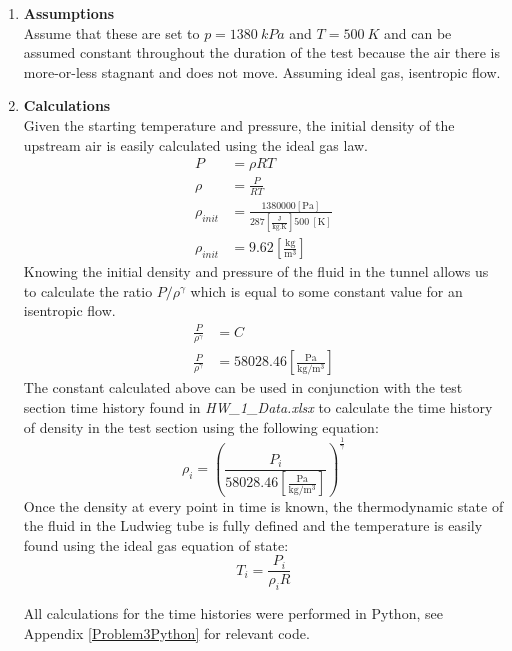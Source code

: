 \documentclass[12pt,letterpaper]{article}
\begin{document}
\begin{enumerate}[label=(\alph*)]
\begin{enumerate}[label=\arabic*.]
			\item{\textbf{Assumptions}}\\
			Assume that these are set to $p = 1380 \ \unit{kPa}$ and $T = 500 \ \unit{K}$ and can be assumed constant throughout the duration of the test because the air there is more-or-less stagnant and does not move. 
			Assuming ideal gas, isentropic flow. 
			\item{\textbf{Calculations}}\\
			Given the starting temperature and pressure, the initial density of the upstream air is easily calculated using the ideal gas law.
			\begin{align*}
				P &= \rho R T\\
				\rho &= \frac{P}{RT}\\
				\rho_{init} &= \frac{1380000 \left[\unit{\pascal}\right]}{287 \left[\frac{\unit{\joule}}{\unit{\kilogram.\kelvin}}\right] 500 \ [\unit{\kelvin}]}\\
				\rho_{init} & = 9.62 \left[\frac{\unit{\kilogram}}{\unit{\meter^3}}\right]
			\end{align*}
			Knowing the initial density and pressure of the fluid in the tunnel allows us to calculate the ratio $P/\rho^{\gamma}$ which is equal to some constant value for an isentropic flow.
			\begin{align*}
				\frac{P}{\rho^{\gamma}} &= C\\
				\frac{P}{\rho^{\gamma}} &= 58028.46 \left[\frac{\unit{\pascal}}{\unit{\kilogram\per\meter^3}}\right]
			\end{align*}
			The constant calculated above can be used in conjunction with the test section time history found in \textit{HW\_1\_Data.xlsx} to calculate the time history of density in the test section using the following equation:
			\begin {equation*}
				\rho_i = \left(\frac{P_i}{58028.46 \left[\frac{\unit{\pascal}}{\unit{\kilogram\per\meter^3}}\right]}\right)^{\frac{1}{\gamma}}
			\end{equation*}
			Once the density at every point in time is known, the thermodynamic state of the fluid in the Ludwieg tube is fully defined and the temperature is easily found using the ideal gas equation of state:
			\begin{equation*}
				T_i = \frac{P_i}{\rho_i R}
			\end{equation*}

			All calculations for the time histories were performed in Python, see Appendix \ref{Problem3Python} for relevant code. 
			

\end{enumerate}
\end{enumerate}
\end{document}
